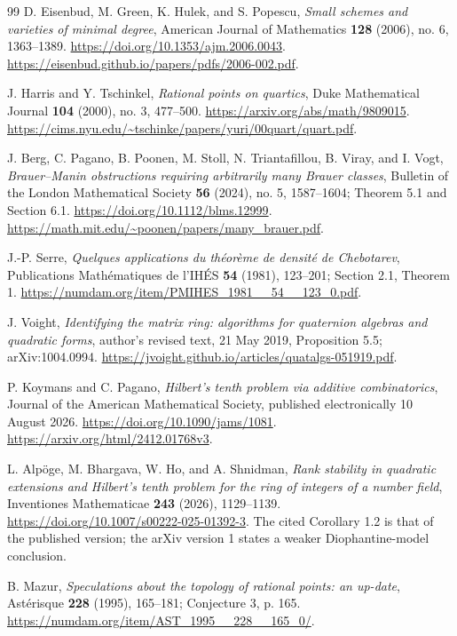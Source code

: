 \begin{thebibliography}{99}
D. Eisenbud, M. Green, K. Hulek, and S. Popescu,
\emph{Small schemes and varieties of minimal degree}, American Journal
of Mathematics \textbf{128} (2006), no. 6, 1363--1389.
\url{https://doi.org/10.1353/ajm.2006.0043}.
\url{https://eisenbud.github.io/papers/pdfs/2006-002.pdf}.

J. Harris and Y. Tschinkel, \emph{Rational points on quartics},
Duke Mathematical Journal \textbf{104} (2000), no. 3, 477--500.
\url{https://arxiv.org/abs/math/9809015}.
\url{https://cims.nyu.edu/~tschinke/papers/yuri/00quart/quart.pdf}.

J. Berg, C. Pagano, B. Poonen, M. Stoll, N. Triantafillou, B. Viray,
and I. Vogt, \emph{Brauer--Manin obstructions requiring arbitrarily many
Brauer classes}, Bulletin of the London Mathematical Society
\textbf{56} (2024), no. 5, 1587--1604; Theorem 5.1 and Section 6.1.
\url{https://doi.org/10.1112/blms.12999}.
\url{https://math.mit.edu/~poonen/papers/many_brauer.pdf}.

J.-P. Serre, \emph{Quelques applications du th\'eor\`eme de densit\'e
de Chebotarev}, Publications Math\'ematiques de l'IH\'ES \textbf{54}
(1981), 123--201; Section 2.1, Theorem 1.
\url{https://numdam.org/item/PMIHES_1981__54__123_0.pdf}.

J. Voight, \emph{Identifying the matrix ring: algorithms for quaternion
algebras and quadratic forms}, author's revised text, 21 May 2019,
Proposition 5.5; arXiv:1004.0994.
\url{https://jvoight.github.io/articles/quatalgs-051919.pdf}.

P. Koymans and C. Pagano, \emph{Hilbert's tenth problem via additive
combinatorics}, Journal of the American Mathematical Society,
published electronically 10 August 2026.
\url{https://doi.org/10.1090/jams/1081}.
\url{https://arxiv.org/html/2412.01768v3}.

L. Alp\"oge, M. Bhargava, W. Ho, and A. Shnidman,
\emph{Rank stability in quadratic extensions and Hilbert's tenth
problem for the ring of integers of a number field}, Inventiones
Mathematicae \textbf{243} (2026), 1129--1139.
\url{https://doi.org/10.1007/s00222-025-01392-3}.
The cited Corollary 1.2 is that of the published version; the arXiv
version 1 states a weaker Diophantine-model conclusion.

B. Mazur, \emph{Speculations about the topology of rational points:
an up-date}, Ast\'erisque \textbf{228} (1995), 165--181;
Conjecture 3, p. 165.
\url{https://numdam.org/item/AST_1995__228__165_0/}.


\end{thebibliography}
